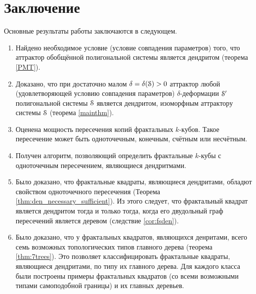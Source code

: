 \chapter*{Заключение}                       %


Основные результаты работы заключаются в следующем.

\begin{enumerate}
\item Найдено необходимое условие (условие совпадения параметров) того, что аттрактор обобщённой полигональной системы является дендритом (теорема \ref{PMT}). 

\item Доказано, что при достаточно малом $\delta=\delta({\EuScript S})>0$ аттрактор любой (удовлетворяющей условию совпадения параметров) $\delta$-деформации ${\EuScript S}'$  полигональной системы ${\EuScript S}$ является дендритом, изоморфным аттрактору системы ${\EuScript S}$ (теорема \ref{mainthm}).

\item Оценена мощность пересечения копий фрактальных $k$-кубов. Такое пересечение может быть одноточечным, конечным, счётным или несчётным.

\item Получен алгоритм, позволяющий определить фрактальные $k$-кубы с одноточечным пересечением, являющиеся дендритмами.

\item Было доказано, что фрактальные квадраты, являющиеся дендритами, обладют свойством одноточечного пересечения (Теорема \ref{thm:den_necessary_sufficient}).
Из этого следует, что фрактальный квадрат является дендритом тогда и только тогда, когда его двудольный граф пересечений является деревом (следствие \ref{cor:fsden}).

\item Было доказано, что у фрактальных квадратов, являющихся денритами, всего семь возможных топологических типов главного дерева (теорема \ref{thm:7trees}).
Это позволяет классифицировать фрактальные квадраты, являющиеся дендритами, по типу их главного дерева.
Для каждого класса были построены примеры фрактальных квадратов (со всеми возможными типами самоподобной границы) и их главных деревьев.
\end{enumerate}

